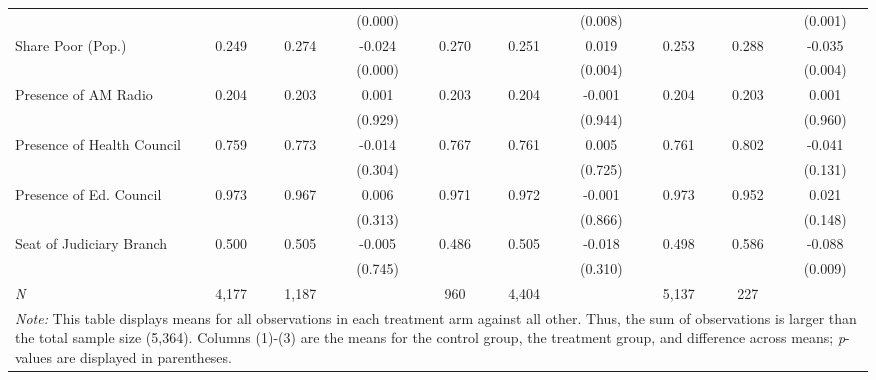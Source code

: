 \begin{table}[!htbp]
\begin{tabular}{@{\extracolsep{-4pt}}l@{\extracolsep{-3pt}}ccccccccc}
                                     &       &       & (0.000)&       &       & (0.008)&        &       & (0.001)   \\
Share Poor (Pop.)                    & 0.249 & 0.274 & -0.024 & 0.270 & 0.251 & 0.019  &  0.253 & 0.288 & -0.035    \\
                                     &       &       & (0.000)&       &       & (0.004)&        &       & (0.004)   \\
Presence of AM Radio                 & 0.204 & 0.203 & 0.001  & 0.203 & 0.204 & -0.001 &  0.204 & 0.203 & 0.001     \\
                                     &       &       & (0.929)&       &       & (0.944)&        &       & (0.960)   \\
Presence of Health Council           & 0.759 & 0.773 & -0.014 & 0.767 & 0.761 & 0.005  &  0.761 & 0.802 & -0.041    \\
                                     &       &       & (0.304)&       &       & (0.725)&        &       & (0.131)   \\
Presence of Ed. Council              & 0.973 & 0.967 & 0.006  & 0.971 & 0.972 & -0.001 &  0.973 & 0.952 & 0.021     \\
                                     &       &       & (0.313)&       &       & (0.866)&        &       & (0.148)   \\
Seat of Judiciary Branch             & 0.500 & 0.505 & -0.005 & 0.486 & 0.505 & -0.018 &  0.498 & 0.586 & -0.088    \\
                                     &       &       & (0.745)&       &       & (0.310)&        &       & (0.009)\B \\
\hline
\emph{N} & 4,177 & 1,187 & & 960 & 4,404 & & 5,137 & 227 & \T  \B \\
\hline
\hline
\multicolumn{10}{p{.95\textwidth}}{\emph{Note:} This table displays means for all observations in each treatment arm against all other. Thus, the sum of observations is larger than the total sample size (5,364). Columns (1)-(3) are the means for the control group, the treatment group, and difference across means; \emph{p}-values are displayed in parentheses.}
\end{tabular}
\end{table}
